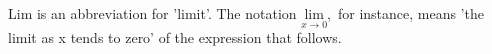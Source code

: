 Lim is an abbreviation for 'limit'. The notation 
$ \underset{x \to 0 }{\text{lim} } , $ for instance, means 'the limit as
x tends to zero' of the expression that follows.